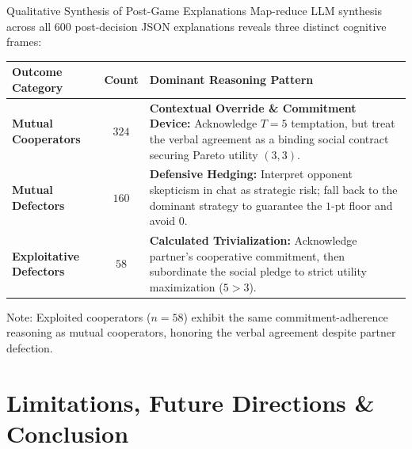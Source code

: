 \documentclass[aspectratio=169, 10pt]{beamer}
\begin{document}
\begin{frame}{Qualitative Synthesis of Post-Game Explanations}
    \small Map-reduce LLM synthesis across all $600$ post-decision JSON explanations reveals three distinct cognitive frames:
    \vspace{0.2cm}
    \footnotesize
    \begin{tabular}{p{2.9cm}cp{8.6cm}}
        \toprule
        \textbf{Outcome Category}       & \textbf{Count} & \textbf{Dominant Reasoning Pattern}                                                                                                                                           \\
        \midrule
        \textbf{Mutual Cooperators}     & $324$          & \textbf{Contextual Override \& Commitment Device:} Acknowledge $T=5$ temptation, but treat the verbal agreement as a binding social contract securing Pareto utility $(3,3)$. \\
        \addlinespace[4pt]
        \textbf{Mutual Defectors}       & $160$          & \textbf{Defensive Hedging:} Interpret opponent skepticism in chat as strategic risk; fall back to the dominant strategy to guarantee the $1$-pt floor and avoid $0$.          \\
        \addlinespace[4pt]
        \textbf{Exploitative Defectors} & $58$           & \textbf{Calculated Trivialization:} Acknowledge partner's cooperative commitment, then subordinate the social pledge to strict utility maximization ($5 > 3$).                \\
        \bottomrule
    \end{tabular}
    \vspace{0.2cm}
    \scriptsize\color{SoftSlate} Note: Exploited cooperators ($n = 58$) exhibit the same commitment-adherence reasoning as mutual cooperators, honoring the verbal agreement despite partner defection.
\end{frame}

\section{Limitations, Future Directions \& Conclusion}
\end{document}
